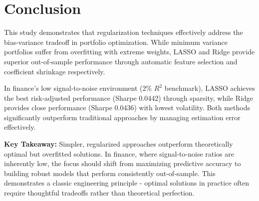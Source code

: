 \documentclass[12pt]{article}
\begin{document}
\section{Conclusion}

This study demonstrates that regularization techniques effectively address the bias-variance tradeoff in portfolio optimization. While minimum variance portfolios suffer from overfitting with extreme weights, LASSO and Ridge provide superior out-of-sample performance through automatic feature selection and coefficient shrinkage respectively.

In finance's low signal-to-noise environment (2\% $R^2$ benchmark), LASSO achieves the best risk-adjusted performance (Sharpe 0.0442) through sparsity, while Ridge provides close performance (Sharpe 0.0436) with lowest volatility. Both methods significantly outperform traditional approaches by managing estimation error effectively.

\textbf{Key Takeaway:} Simpler, regularized approaches outperform theoretically optimal but overfitted solutions. In finance, where signal-to-noise ratios are inherently low, the focus should shift from maximizing predictive accuracy to building robust models that perform consistently out-of-sample. This demonstrates a classic engineering principle - optimal solutions in practice often require thoughtful tradeoffs rather than theoretical perfection.
\end{document}
